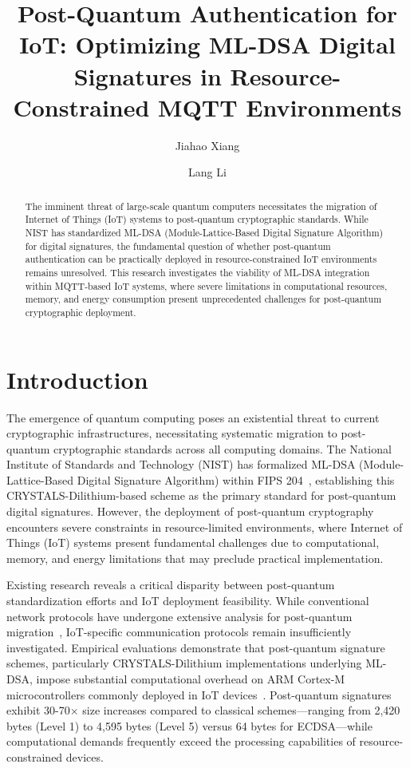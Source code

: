 \documentclass[journal=tches,final]{iacrtrans}
\author{Jiahao Xiang\inst{1} \and Lang Li\inst{1}}
\institute{
  Hengyang Normal University, College of Computer Science and Technology, Hengyang, China
}
\title[ML-DSA in IoT: MQTT Post-Quantum Authentication]{Post-Quantum Authentication for IoT: Optimizing ML-DSA Digital Signatures in Resource-Constrained MQTT Environments}
\begin{document}
\maketitle


\color{blue}
\begin{abstract}
The imminent threat of large-scale quantum computers necessitates the migration of Internet of Things (IoT) systems to post-quantum cryptographic standards. While NIST has standardized ML-DSA (Module-Lattice-Based Digital Signature Algorithm) for digital signatures, the fundamental question of whether post-quantum authentication can be practically deployed in resource-constrained IoT environments remains unresolved. This research investigates the viability of ML-DSA integration within MQTT-based IoT systems, where severe limitations in computational resources, memory, and energy consumption present unprecedented challenges for post-quantum cryptographic deployment.

\end{abstract}


\section{Introduction}

The emergence of quantum computing poses an existential threat to current cryptographic infrastructures, necessitating systematic migration to post-quantum cryptographic standards across all computing domains. The National Institute of Standards and Technology (NIST) has formalized ML-DSA (Module-Lattice-Based Digital Signature Algorithm) within FIPS 204~\cite{NIST-FIPS-204}, establishing this CRYSTALS-Dilithium-based scheme as the primary standard for post-quantum digital signatures. However, the deployment of post-quantum cryptography encounters severe constraints in resource-limited environments, where Internet of Things (IoT) systems present fundamental challenges due to computational, memory, and energy limitations that may preclude practical implementation.

Existing research reveals a critical disparity between post-quantum standardization efforts and IoT deployment feasibility. While conventional network protocols have undergone extensive analysis for post-quantum migration~\cite{Kampanakis2020, Sikeridis2020}, IoT-specific communication protocols remain insufficiently investigated. Empirical evaluations demonstrate that post-quantum signature schemes, particularly CRYSTALS-Dilithium implementations underlying ML-DSA, impose substantial computational overhead on ARM Cortex-M microcontrollers commonly deployed in IoT devices~\cite{Banegas2021, Marchsreiter2024}. Post-quantum signatures exhibit 30-70× size increases compared to classical schemes—ranging from 2,420 bytes (Level 1) to 4,595 bytes (Level 5) versus 64 bytes for ECDSA—while computational demands frequently exceed the processing capabilities of resource-constrained devices.
\end{document}
